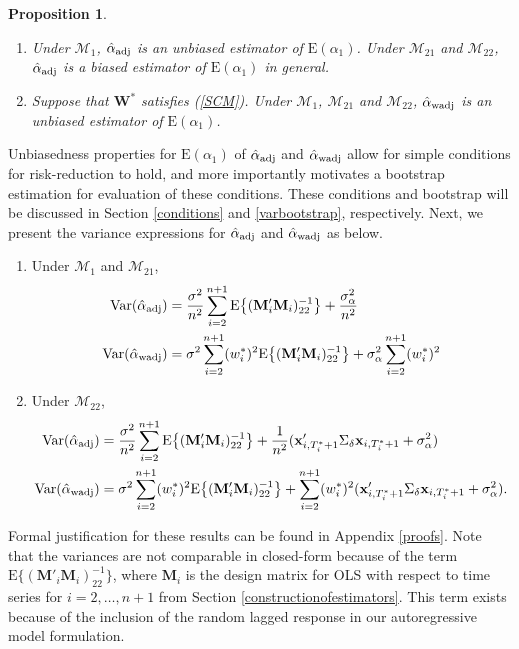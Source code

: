 \documentclass[11pt,3p,review,authoryear]{elsarticle}
\def\mbf#1{\mathbf{#1}} %
\def\mrm#1{\mathrm{#1}} %
\def\mc#1{\mathcal{#1}} %
\def\E#1{\mathrm{E}(#1)} %
\def\var#1{\mathrm{Var}(#1)} %
\newtheorem{prop}{Proposition}
\theoremstyle{definition}
\begin{document}
\begin{prop}
\label{unbiased} 
\quad 
\begin{enumerate}[label = (\roman*)]
  \item Under $\mc{M}_1$, $\hat{\alpha}_{\rm adj}$ is an unbiased estimator of $\E{\alpha_1}$. Under $\mc{M}_{21}$ and $\mc{M}_{22}$, $\hat{\alpha}_{\rm adj}$ is a biased estimator of $\E{\alpha_1}$ in general.
  \item Suppose that $\mbf{W}^*$ satisfies (\ref{SCM}). Under $\mc{M}_{1}$, $\mc{M}_{21}$ and $\mc{M}_{22}$, $\hat{\alpha}_{\rm wadj}$ is an unbiased estimator of $\E{\alpha_1}$.
\end{enumerate}
\end{prop}


Unbiasedness properties for $\E{\alpha_1}$ of $\hat{\alpha}_{\rm adj}$ and $\hat{\alpha}_{\rm wadj}$ allow for simple conditions for risk-reduction to hold, and more importantly motivates a bootstrap estimation for evaluation of these conditions. 
These conditions and bootstrap will be discussed in Section \ref{conditions} and \ref{varbootstrap}, respectively. Next, we present the variance expressions for $\hat{\alpha}_{\rm adj}$ and $\hat{\alpha}_{\rm wadj}$ as below.

\begin{enumerate}[label = (\roman*)]
  \item Under $\mc{M}_1$ and $\mc{M}_{21}$,  
\begin{align*}
  \var{\hat{\alpha}_{\rm adj}} 
  &=\frac{\sigma^2}{n^2}\sum_{i=2}^{n+1}\mrm{E}\big\{(\mbf{M}'_i\mbf{M}_i)^{-1}_{22}\big\}+\frac{\sigma^2_{\alpha}}{n^2}\\
\var{\hat{\alpha}_{\rm wadj}}  &= \sigma^2\sum_{i=2}^{n+1}(w_i^*)^2\mrm{E}\big\{(\mbf{M}'_i\mbf{M}_i)^{-1}_{22}\big\}+\sigma^2_{\alpha}\sum_{i=2}^{n+1}(w_i^*)^2
\end{align*}
\item Under $\mc{M}_{22}$, 
\begin{align*}
\var{\hat{\alpha}_{\rm adj}} 
  &=\frac{\sigma^2}{n^2}\sum_{i=2}^{n+1}\mrm{E}\big\{(\mbf{M}'_i\mbf{M}_i)^{-1}_{22}\big\} +\frac{1}{n^2}(\mbf{x}_{i, T_i^*+1}'\Sigma_{\delta}\mbf{x}_{i, T_i^*+1} + \sigma^2_{\alpha})\\
  \var{\hat{\alpha}_{\rm wadj}} 
  &= \sigma^2\sum_{i=2}^{n+1}(w_i^*)^2\mrm{E}\big\{(\mbf{M}'_i\mbf{M}_i)^{-1}_{22}\big\} + \sum_{i=2}^{n+1} (w_i^*)^2 (\mbf{x}_{i, T_i^*+1}'\Sigma_{\delta}\mbf{x}_{i, T_i^*+1} + \sigma^2_{\alpha}).
\end{align*}
\end{enumerate}
Formal justification for these results can be found in Appendix \ref{proofs}. Note that the variances are not comparable in closed-form 
because of the term $\mrm{E}\big\{(\mbf{M}'_i\mbf{M}_i)^{-1}_{22}\big\}$, where  $\mbf{M}_i$ is the design matrix for OLS with respect to time series for $i = 2, \ldots, n+1$ from Section \ref{constructionofestimators}.  This term exists because of the inclusion of the random lagged response in our autoregressive model formulation.   
\end{document}

